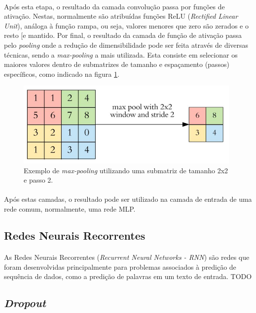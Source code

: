 \documentclass[grad,numbers]{coppe}
\begin{document}
  		\paragraph{}Após esta etapa, o resultado da camada convolução passa por funções de ativação. Nestas, normalmente são atribuídas funções ReLU (\textit{Rectified Linear Unit}), análoga à função rampa, ou seja, valores menores que zero são zerados e o resto [e mantido. Por final, o resultado da camada de função de ativação passa pelo \textit{pooling} onde a redução de dimensibilidade pode ser feita através de diversas técnicas, sendo a \textit{max-pooling} a mais utilizada. Esta consiste em selecionar os maiores valores dentro de submatrizes de tamanho e espaçamento (passos) específicos, como indicado na figura \ref{fig:pooling-fig}.
  		\begin{figure}[h]
  			\centering
  			\includegraphics[width=11cm]{pooling.jpg}
  			\caption{Exemplo de \textit{max-pooling} utilizando uma submatriz de tamanho 2x2 e passo 2\cite{kernel-example}.}
  			\label{fig:pooling-fig}
  		\end{figure}
  		\paragraph{}Após estas camadas, o resultado pode ser utilizado na camada de entrada de uma rede comum, normalmente, uma rede MLP.
	  \subsection{Redes Neurais Recorrentes}
	  	\paragraph{}As Redes Neurais Recorrentes (\textit{Recurrent Neural Networks - RNN}) são redes que foram desenvolvidas principalmente para problemas associados à predição de sequência de dados, como a predição de palavras em um texto de entrada. TODO
  	\subsection{\textit{Dropout}}
\end{document}
